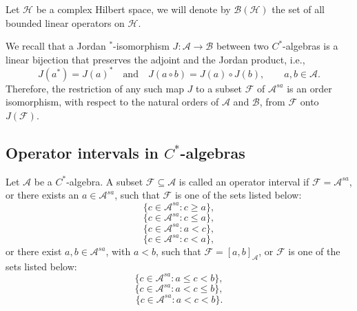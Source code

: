 \documentclass[12pt]{amsart}
\theoremstyle{definition}
\theoremstyle{remark}
\numberwithin{equation}{section}
\begin{document}
  Let $\mathcal{H}$ be a complex Hilbert space, we will  denote by $\mathcal{B}(\mathcal{H})$  the set of all bounded linear operators on $\mathcal{H}$. 
 
 We recall  that a Jordan $^*$-isomorphism  $J: \mathcal{A}\to \mathcal{B}$ between two   $C^*$-algebras  is a linear bijection  that preserves the adjoint and  the Jordan product, i.e., $$J(a^*)=J(a)^* \quad \mbox{and} \quad J(a \circ b)=J(a)\circ J(b),\qquad a,b\in \mathcal{A}.$$
Therefore,  the restriction of any such map    $J$ to a  subset $\mathcal{F}$ of $\mathcal{A}^{sa}$  is an order isomorphism, with respect to the natural orders of $\mathcal{A}$ and $\mathcal{B}$, from  $\mathcal{F}$ onto $J(\mathcal{F})$.
 
 



\subsection{Operator intervals in  $C^*$-algebras}
Let $\mathcal{A}$ be a $C^{*}$-algebra.  
A subset $\mathcal{F} \subseteq \mathcal{A}$ is called an operator interval if  
$\mathcal{F} = \mathcal{A}^{sa}$, or there exists an $a\in \mathcal{A}^{sa}$,  
such that $\mathcal{F}$ is one of the sets listed below:
$$\{c\in \mathcal{A}^{sa}:  c\geq a\},$$
$$\{c\in \mathcal{A}^{sa}:  c\leq a\},$$
$$\{c\in \mathcal{A}^{sa}: a<c \},$$
$$\{c\in \mathcal{A}^{sa}:  c<a \},$$
or there exist $a,b \in \mathcal{A}^{sa}$, with $a < b$,  
such that $\mathcal{F}=[a,b]_{\mathcal{A}}$, or $\mathcal{F}$ is one of the sets listed below:
$$\{c\in \mathcal{A}^{sa}: a\leq c< b\},$$
$$\{c\in \mathcal{A}^{sa}: a< c\leq b\},$$
$$\{c\in \mathcal{A}^{sa}: a< c< b\}.$$
\end{document}
